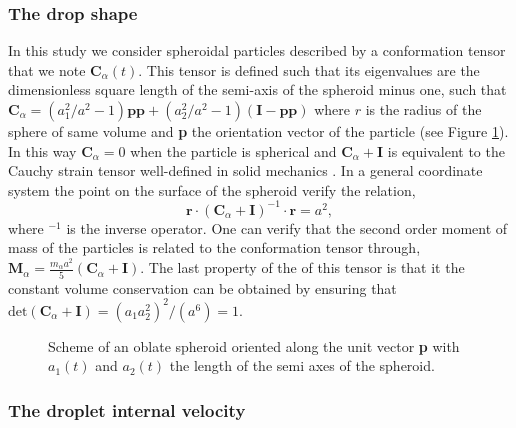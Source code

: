 \subsubsection*{The drop shape}

In this study we consider spheroidal particles described by a conformation tensor that we note $\textbf{C}_\alpha(t)$.  
This tensor is defined such that its eigenvalues are the dimensionless square length of the semi-axis of the spheroid minus one, such that $\textbf{C}_\alpha = (a_1^2/a^2 - 1) \textbf{pp} + (a_2^2 /a^2 - 1) (\textbf{I}-\textbf{pp})$ where $r$ is the radius of the sphere of same volume and \textbf{p} the orientation vector of the particle (see Figure \ref{fig:scheme2}).  
In this way $\textbf{C}_\alpha = 0$ when the particle is spherical and  $\textbf{C}_\alpha + \textbf{I}$ is equivalent to the Cauchy strain tensor well-defined in solid mechanics \citet{mwasame2017macroscopic}. 
In a general coordinate system the point on the surface of the spheroid verify the relation, 
\begin{equation*}
    \textbf{r}\cdot(\textbf{C}_\alpha + \textbf{I})^{-1}\cdot\textbf{r} = a^2,
\end{equation*}
where $^{-1}$ is the inverse operator.  
One can verify that the second order moment of mass of the particles is related to the conformation tensor through, $\textbf{M}_\alpha = \frac{m_\alpha  a^2}{5} (\textbf{C}_\alpha + \textbf{I})$. 
The last property of the of this tensor is that it the constant volume conservation can be obtained by ensuring that $\text{det}(\textbf{C}_\alpha +\textbf{I}) = (a_1a_2^2)^2 /(a^6) = 1$. 
\begin{figure}[h!]
    \centering
    \hfill
    \hfill
    \caption{Scheme of an  oblate spheroid oriented along the unit vector \textbf{p} with $a_1(t)$ and $a_2(t)$ the length of the semi axes of the spheroid.}
    \label{fig:scheme2}
\end{figure}


\subsubsection*{The droplet internal velocity}

